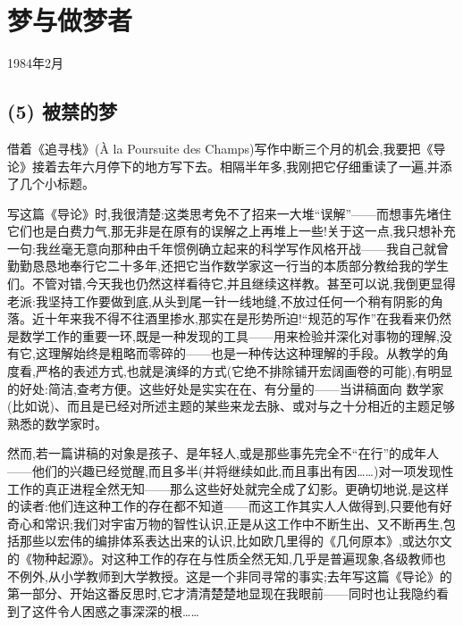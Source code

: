 \chapter{梦与做梦者}

\noindent 1984年2月\par

\section{(5) 被禁的梦}

 借着《追寻栈》(À la Poursuite des Champs)写作中断三个月的机会,我要把《导论》接着去年六月停下的地方写下去。相隔半年多,我刚把它仔细重读了一遍,并添了几个小标题。

写这篇《导论》时,我很清楚:这类思考免不了招来一大堆“误解”——而想事先堵住它们也是白费力气,那无非是在原有的误解之上再堆上一些!关于这一点,我只想补充一句:我丝毫无意向那种由千年惯例确立起来的科学写作风格开战——我自己就曾勤勤恳恳地奉行它二十多年,还把它当作数学家这一行当的本质部分教给我的学生们。不管对错,今天我也仍然这样看待它,并且继续这样教。甚至可以说,我倒更显得老派:我坚持工作要做到底,从头到尾一针一线地缝,不放过任何一个稍有阴影的角落。近十年来我不得不往酒里掺水,那实在是形势所迫!“规范的写作”在我看来仍然是数学工作的重要一环,既是一种发现的工具——用来检验并深化对事物的理解,没有它,这理解始终是粗略而零碎的——也是一种传达这种理解的手段。从教学的角度看,严格的表述方式,也就是演绎的方式(它绝不排除铺开宏阔画卷的可能),有明显的好处:简洁,查考方便。这些好处是实实在在、有分量的——当讲稿面向
 数学家(比如说)、而且是已经对所述主题的某些来龙去脉、或对与之十分相近的主题足够熟悉的数学家时。

然而,若一篇讲稿的对象是孩子、是年轻人,或是那些事先完全不“在行”的成年人——他们的兴趣已经觉醒,而且多半(并将继续如此,而且事出有因……)对一项发现性工作的真正进程全然无知——那么这些好处就完全成了幻影。更确切地说,是这样的读者:他们连这种工作的存在都不知道——而这工作其实人人做得到,只要他有好奇心和常识;我们对宇宙万物的智性认识,正是从这工作中不断生出、又不断再生,包括那些以宏伟的编排体系表达出来的认识,比如欧几里得的《几何原本》,或达尔文的《物种起源》。对这种工作的存在与性质全然无知,几乎是普遍现象,各级教师也不例外,从小学教师到大学教授。这是一个非同寻常的事实;去年写这篇《导论》的第一部分、开始这番反思时,它才清清楚楚地显现在我眼前——同时也让我隐约看到了这件令人困惑之事深深的根……

